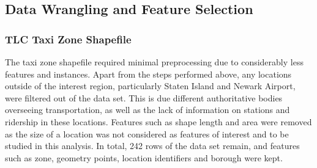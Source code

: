 \documentclass[11pt]{article}
\begin{document}
\subsection{Data Wrangling and Feature Selection}

\subsubsection{TLC Taxi Zone Shapefile}
The taxi zone shapefile required minimal preprocessing due to considerably less features and instances. Apart from the steps performed above, any locations outside of the interest region, particularly Staten Island and Newark Airport, were filtered out of the data set. This is due different authoritative bodies overseeing transportation, as well as the lack of information on stations and ridership in these locations. Features such as shape length and area were removed as the size of a location was not considered as features of interest and to be studied in this analysis. In total, 242 rows of the data set remain, and features such as zone, geometry points, location identifiers and borough were kept.
\end{document}
